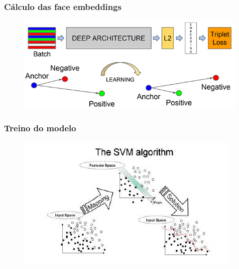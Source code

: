 \documentclass{beamer}
\begin{document}

\begin{frame}
\frametitle{Cálculo das face embeddings}
\begin{figure}
\includegraphics[width=1\linewidth]{figs/triplet_loss.png}
\end{figure}   
\end{frame}

\begin{frame}
\frametitle{Treino do modelo}
\begin{figure}
\includegraphics[width=1\linewidth]{figs/SvmFlow.jpg}
\end{figure}   
\end{frame}
\end{document}
